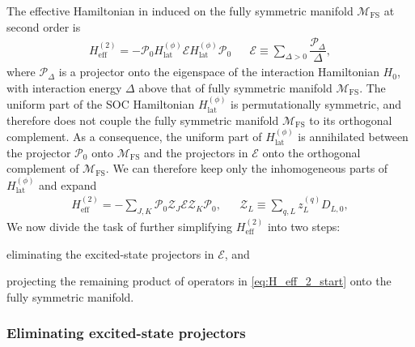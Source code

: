 \documentclass[nofootinbib,notitlepage,11pt]{revtex4-2}
\renewcommand{\t}{\text} %
\newcommand{\f}[2]{\dfrac{#1}{#2}} %
\newcommand{\1}{\mathds{1}}
\newcommand{\E}{\mathcal{E}}
\newcommand{\M}{\mathcal{M}}
\renewcommand{\P}{\mathcal{P}}
\newcommand{\Z}{\mathcal{Z}}
\newcommand{\FS}{\text{FS}}
\begin{document}
The effective Hamiltonian in induced on the fully symmetric manifold
$\M_\FS$ at second order is\cite{bravyi2011schrieffer,
  perlin2019effective}
\begin{align}
  H_{\t{eff}}^{(2)}
  = - \P_0 H_{\t{lat}}^{(\phi)} \E H_{\t{lat}}^{(\phi)} \P_0
  &&
  \E \equiv \sum_{\Delta>0} \f{\P_\Delta}{\Delta},
\end{align}
where $\P_\Delta$ is a projector onto the eigenspace of the
interaction Hamiltonian $H_0$, with interaction energy $\Delta$ above
that of fully symmetric manifold $\M_\FS$.  The uniform part of the
SOC Hamiltonian $H_{\t{lat}}^{(\phi)}$ is permutationally symmetric,
and therefore does not couple the fully symmetric manifold $\M_\FS$ to
its orthogonal complement.  As a consequence, the uniform part of
$H_{\t{lat}}^{(\phi)}$ is annihilated between the projector $\P_0$
onto $\M_\FS$ and the projectors in $\E$ onto the orthogonal
complement of $\M_\FS$.  We can therefore keep only the inhomogeneous
parts of $H_{\t{lat}}^{(\phi)}$ and expand
\begin{align}
  H_{\t{eff}}^{(2)}
  = -\sum_{J,K} \P_0 \Z_J \E \Z_K \P_0,
  &&
  \Z_L \equiv \sum_{q,L} z_L^{(q)} D_{L,0},
  \label{eq:H_eff_2_start}
\end{align}
We now divide the task of further simplifying $H_{\t{eff}}^{(2)}$ into
two steps:
\begin{enumerate*}
\item eliminating the excited-state projectors in $\E$, and
\item projecting the remaining product of operators in
  \eqref{eq:H_eff_2_start} onto the fully symmetric manifold.
\end{enumerate*}

\subsubsection{Eliminating excited-state projectors}
\end{document}
